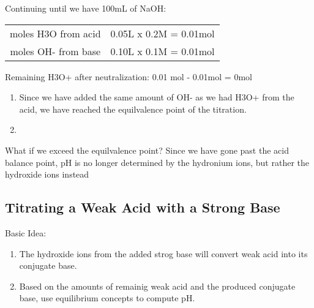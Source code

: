 \documentclass{article}  %
\begin{document}
Continuing until we have 100mL of NaOH:
\newline
\begin{tabular}{ c c }
    moles H3O from acid & 0.05L x 0.2M = 0.01mol \\
    moles OH- from base & 0.10L x 0.1M = 0.01mol \\
\end{tabular}
\newline
Remaining H3O+ after neutralization: 0.01 mol - 0.01mol = 0mol \\
\begin{enumerate}
    \item Since we have added the same amount of OH- as we had H3O+ from the acid, we have reached the equilvalence point of the titration.
    \item 
\end{enumerate}

What if we exceed the equilvalence point? 
\newline
Since we have gone past the acid balance point, pH is no longer determined by the hydronium ions, but rather the hydroxide ions instead

\subsection*{Titrating a Weak Acid with a Strong Base}
Basic Idea:
\begin{enumerate}
    \item The hydroxide ions from the added strog base will convert weak acid into its conjugate base.
    \item Based on the amounts of remainig weak acid and the produced conjugate base, use equilibrium concepts to compute pH.
\end{enumerate}
\end{document}
